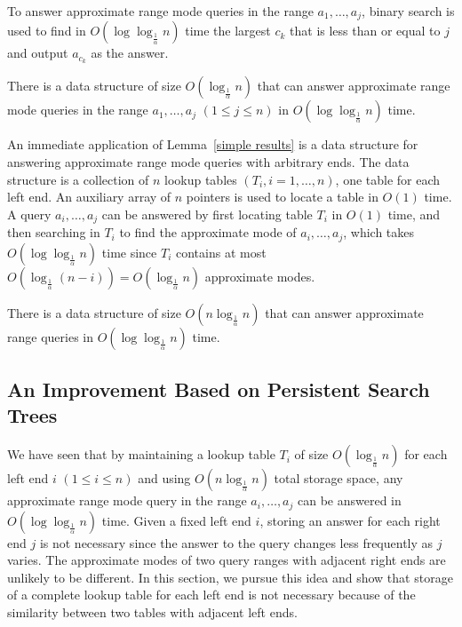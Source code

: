\documentclass{llncs}
\begin{document}
To answer approximate range mode queries in the range
$a_1,\ldots,a_j$, binary search is used to
find in $O(\log\log_{\frac{1}{\alpha}} n)$ time the largest $c_k$ that is  
less than or equal to  $j$ and output $a_{c_k}$ as the answer.

\begin{lemma}\label{simple results}
There is a data structure of size $O(\log_{\frac{1}{\alpha}} n)$ that can answer
approximate range mode queries in the range $a_1,\ldots,a_j$ $(1 \leq j \leq n)$ in 
$O(\log\log_{\frac{1}{\alpha}} n)$ time.
\end{lemma}

An immediate application of Lemma~\ref{simple results} is a data 
structure for answering approximate range mode queries with 
arbitrary ends. The data structure is a collection of $n$ 
lookup tables $(T_i, i=1,\ldots,n)$, one table for each left end. 
An auxiliary array of $n$ pointers is used to locate a table 
in $O(1)$ time. A query $a_i, \ldots,a_j$ can be answered by 
first locating table $T_i$ in $O(1)$ time,  and 
then searching in $T_i$ to find the approximate 
mode of $a_i,\ldots,a_j$, which takes $O(\log\log_{\frac{1}{\alpha}} n)$ time 
since $T_i$ contains at most $O(\log_{\frac{1}{\alpha}} (n-i)) = O(\log_{\frac{1}{\alpha}} n)$ approximate modes.


\begin{corollary}
There is a data structure of size $O(n\log_{\frac{1}{\alpha}} n)$ that can answer approximate  range queries
in $O(\log\log_{\frac{1}{\alpha}} n)$ time. 
\end{corollary}


\subsection{An Improvement Based on Persistent Search Trees}


We have seen that by maintaining a lookup table $T_i$ of 
size $O(\log_{\frac{1}{\alpha}} n)$ 
for each left end $i$ $(1 \leq i \leq n)$ 
and using $O(n\log_{\frac{1}{\alpha}} n)$ total storage space, 
any approximate range mode query in the range
$a_i,\ldots,a_j$ can be answered in $O(\log\log_{\frac{1}{\alpha}} n)$ 
time. Given a fixed left end 
$i$, storing an answer for each right end $j$ is not necessary since 
the answer to the query changes less frequently as $j$ varies. 
The approximate modes of two query ranges with adjacent right ends are unlikely to be 
different. In this section, 
we pursue this idea and show that storage of a complete lookup table for each left end is not 
necessary because of the similarity between two tables with adjacent left ends.  
\end{document}
